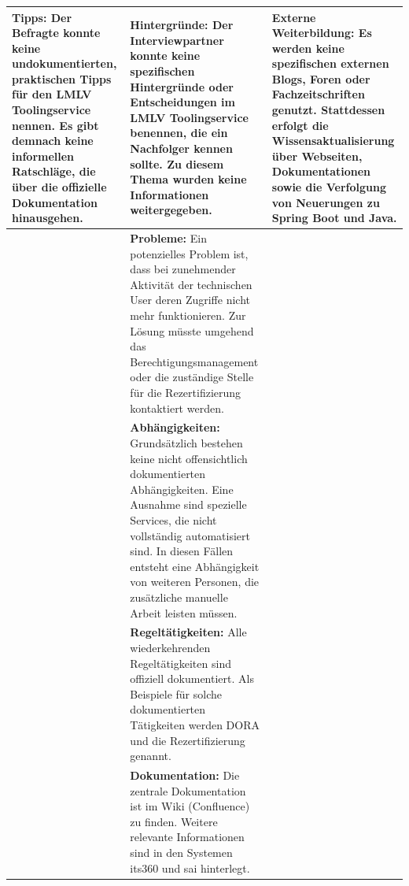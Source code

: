 \documentclass[
  10pt,
  ngerman,
  a4paper,
  toc=graduated,
  numbers=noenddot,
  headings=standardclasses,
  nonumberlist
]{scrartcl}
\begin{document}
{\begin{longtable}{|L{0.31\textwidth}|L{0.31\textwidth}|L{0.31\textwidth}|}
\textbf{Tipps:}\newline
Der Befragte konnte keine undokumentierten, praktischen Tipps für den LMLV Toolingservice nennen. Es gibt demnach keine informellen Ratschläge, die über die offizielle Dokumentation hinausgehen.
&
\textbf{Hintergründe:}\newline
Der Interviewpartner konnte keine spezifischen Hintergründe oder Entscheidungen im LMLV Toolingservice benennen, die ein Nachfolger kennen sollte. Zu diesem Thema wurden keine Informationen weitergegeben.
&
\textbf{Externe Weiterbildung:}\newline
Es werden keine spezifischen externen Blogs, Foren oder Fachzeitschriften genutzt. Stattdessen erfolgt die Wissensaktualisierung über Webseiten, Dokumentationen sowie die Verfolgung von Neuerungen zu Spring Boot und Java.
\\
\hline

&
\textbf{Probleme:}\newline
Ein potenzielles Problem ist, dass bei zunehmender Aktivität der technischen User deren Zugriffe nicht mehr funktionieren. Zur Lösung müsste umgehend das Berechtigungsmanagement oder die zuständige Stelle für die Rezertifizierung kontaktiert werden.
&
\\
\hline

&
\textbf{Abhängigkeiten:}\newline
Grundsätzlich bestehen keine nicht offensichtlich dokumentierten Abhängigkeiten. Eine Ausnahme sind spezielle Services, die nicht vollständig automatisiert sind. In diesen Fällen entsteht eine Abhängigkeit von weiteren Personen, die zusätzliche manuelle Arbeit leisten müssen.
&
\\
\hline

&
\textbf{Regeltätigkeiten:}\newline
Alle wiederkehrenden Regeltätigkeiten sind offiziell dokumentiert. Als Beispiele für solche dokumentierten Tätigkeiten werden DORA und die Rezertifizierung genannt.
&
\\
\hline

&
\textbf{Dokumentation:}\newline
Die zentrale Dokumentation ist im Wiki (Confluence) zu finden. Weitere relevante Informationen sind in den Systemen its360 und sai hinterlegt.
&
\\
\hline

\end{longtable}
}
\end{document}
